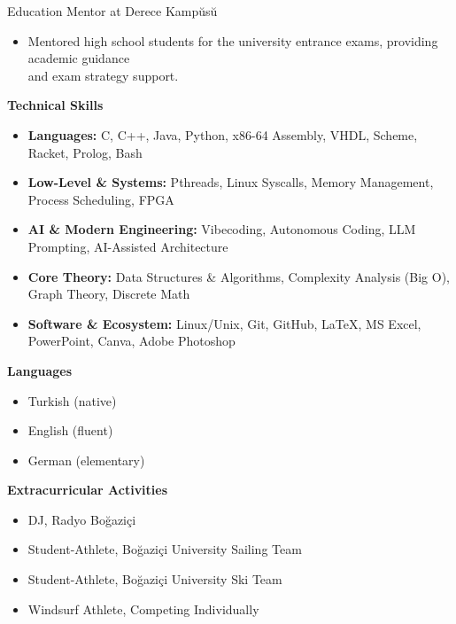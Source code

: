\documentclass[a4paper]{article}
\newcommand{\sechead}[1]{
    \vspace{10pt}
    {\fontsize{12}{14}\bfseries #1} \par
    \vspace{4pt}
}
\newcommand{\entry}[2]{
    {\fontsize{10}{12}\fontseries{sb}\selectfont #1} \hfill {\fontsize{8}{10}\selectfont #2} \par
}
\newcommand{\desc}[1]{
    {\fontsize{8}{11}\selectfont #1}
}
\begin{document}
\entry{Education Mentor at Derece Kamp\u{u}s\u{u}}{}
\begin{itemize}[leftmargin=1.1em, itemsep=0pt, parsep=0pt, topsep=2pt]
   \item \desc{Mentored high school students for the university entrance exams, providing academic guidance\\ and exam strategy support.}
\end{itemize}

\sechead{Technical Skills}
\begin{itemize}[leftmargin=1.1em, itemsep=0pt, parsep=0pt, topsep=2pt]
   \item \desc{\textbf{Languages:} C, C++, Java, Python, x86-64 Assembly, VHDL, Scheme, Racket, Prolog, Bash}
   \item \desc{\textbf{Low-Level \& Systems:} Pthreads, Linux Syscalls, Memory Management, Process Scheduling, FPGA}
   \item \desc{\textbf{AI \& Modern Engineering:} Vibecoding, Autonomous Coding, LLM Prompting, AI-Assisted Architecture}
   \item \desc{\textbf{Core Theory:} Data Structures \& Algorithms, Complexity Analysis (Big O), Graph Theory, Discrete Math}
   \item \desc{\textbf{Software \& Ecosystem:} Linux/Unix, Git, GitHub, LaTeX, MS Excel, PowerPoint, Canva, Adobe Photoshop}
\end{itemize}

\vspace{5pt}
\begin{minipage}[t]{0.35\textwidth}
    \sechead{Languages}
    \begin{itemize}[leftmargin=1.1em, itemsep=0pt, parsep=0pt, topsep=2pt]
       \item \desc{Turkish (native)}
       \item \desc{English (fluent)}
       \item \desc{German (elementary)}
    \end{itemize}
\end{minipage}
\hfill
\begin{minipage}[t]{0.60\textwidth}
    \sechead{Extracurricular Activities}
    \begin{itemize}[leftmargin=1.1em, itemsep=0pt, parsep=0pt, topsep=2pt]
       \item \desc{DJ, Radyo Bo\u{g}azi\c{c}i}
       \item \desc{Student-Athlete, Bo\u{g}azi\c{c}i University Sailing Team}
       \item \desc{Student-Athlete, Bo\u{g}azi\c{c}i University Ski Team}
       \item \desc{Windsurf Athlete, Competing Individually}
    \end{itemize}
\end{minipage}
\end{document}
